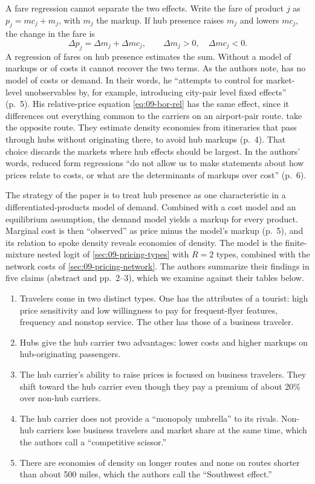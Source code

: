 A fare regression cannot separate the two effects. Write the fare of product $j$ as $p_j=mc_j+m_j$, with
$m_j$ the markup. If hub presence raises $m_j$ and lowers $mc_j$, the change in the fare is
\begin{equation*}
\Delta p_j=\Delta m_j+\Delta mc_j,\qquad \Delta m_j>0,\quad \Delta mc_j<0 .
\end{equation*}
A regression of fares on hub presence estimates the sum. Without a model of markups or of costs it cannot
recover the two terms. As the authors note, \citet{Borenstein1989} has no model of costs or demand. In
their words, he ``attempts to control for market-level unobservables by, for example, introducing
city-pair level fixed effects'' (p.~5). His relative-price equation \eqref{eq:09-bor-rel} has the same
effect, since it differences out everything common to the carriers on an airport-pair route.
\citet{BruecknerSpiller1994} take the
opposite route. They estimate density economies from itineraries that pass through hubs without
originating there, to avoid hub markups (p.~4). That choice discards the markets where hub effects should
be largest. In the authors' words, reduced form regressions ``do not allow us to make statements about how
prices relate to costs, or what are the determinants of markups over cost'' (p.~6).

The strategy of the paper is to treat hub presence as one characteristic in a differentiated-products
model of demand. Combined with a cost model and an equilibrium assumption, the demand model yields a
markup for every product. Marginal cost is then ``observed'' as price minus the model's markup (p.~5), and
its relation to spoke density reveals economies of density. The model is the finite-mixture nested logit
of \cref{sec:09-pricing-types} with $R=2$ types, combined with the network costs of
\cref{sec:09-pricing-network}. The authors summarize their findings in five claims (abstract and
pp.~2--3), which we examine against their tables below.
\begin{enumerate}[label=(\roman*)]
  \item Travelers come in two distinct types. One has the attributes of a tourist: high price sensitivity
  and low willingness to pay for frequent-flyer features, frequency and nonstop service. The other has
  those of a business traveler.
  \item Hubs give the hub carrier two advantages: lower costs and higher markups on hub-originating
  passengers.
  \item The hub carrier's ability to raise prices is focused on business travelers. They shift toward the
  hub carrier even though they pay a premium of about 20\% over non-hub carriers.
  \item The hub carrier does not provide a ``monopoly umbrella'' to its rivals. Non-hub carriers lose
  business travelers and market share at the same time, which the authors call a ``competitive scissor.''
  \item There are economies of density on longer routes and none on routes shorter than about 500 miles,
  which the authors call the ``Southwest effect.''
\end{enumerate}

